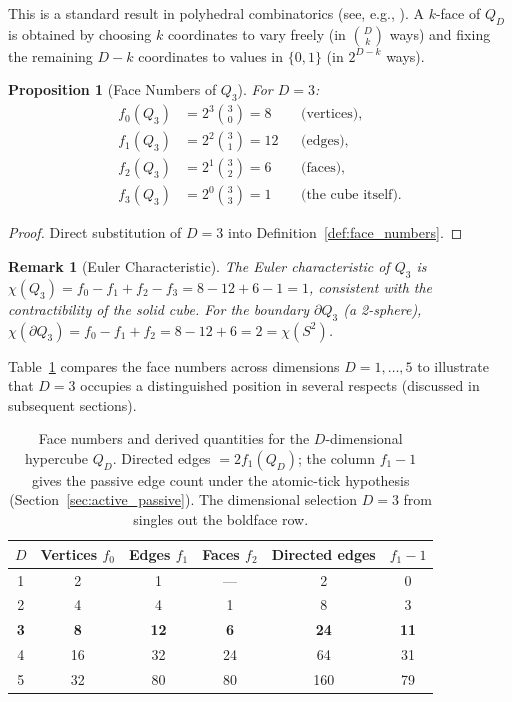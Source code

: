 \documentclass[11pt]{article}
\newtheorem{proposition}[theorem]{Proposition}
\newtheorem{remark}[theorem]{Remark}
\begin{document}
This is a standard result in polyhedral combinatorics (see, e.g., \cite{Ziegler1995}).
A $k$-face of $Q_D$ is obtained by choosing $k$ coordinates to vary freely (in $\binom{D}{k}$ ways) and fixing the remaining $D-k$ coordinates to values in $\{0,1\}$ (in $2^{D-k}$ ways).

\begin{proposition}[Face Numbers of $Q_3$]\label{prop:face_numbers}
For $D = 3$:
\begin{align}
f_0(Q_3) &= 2^3 \binom{3}{0} = 8 &&\text{(vertices)}, \label{eq:vertices} \\
f_1(Q_3) &= 2^2 \binom{3}{1} = 12 &&\text{(edges)}, \label{eq:edges} \\
f_2(Q_3) &= 2^1 \binom{3}{2} = 6 &&\text{(faces)}, \label{eq:faces} \\
f_3(Q_3) &= 2^0 \binom{3}{3} = 1 &&\text{(the cube itself)}. \label{eq:cube}
\end{align}
\end{proposition}

\begin{proof}
Direct substitution of $D = 3$ into Definition~\ref{def:face_numbers}.
\end{proof}

\begin{remark}[Euler Characteristic]
The Euler characteristic of $Q_3$ is $\chi(Q_3) = f_0 - f_1 + f_2 - f_3 = 8 - 12 + 6 - 1 = 1$, consistent with the contractibility of the solid cube.
For the \emph{boundary} $\partial Q_3$ (a 2-sphere), $\chi(\partial Q_3) = f_0 - f_1 + f_2 = 8 - 12 + 6 = 2 = \chi(S^2)$.
\end{remark}

Table~\ref{tab:face_numbers} compares the face numbers across dimensions $D = 1, \ldots, 5$ to illustrate that $D = 3$ occupies a distinguished position in several respects (discussed in subsequent sections).

\begin{table}[h]
\centering
\begin{tabular}{cccccc}
\toprule
$D$ & Vertices $f_0$ & Edges $f_1$ & Faces $f_2$ & Directed edges & $f_1 - 1$ \\
\midrule
1 & 2 & 1 & --- & 2 & 0 \\
2 & 4 & 4 & 1 & 8 & 3 \\
\textbf{3} & \textbf{8} & \textbf{12} & \textbf{6} & \textbf{24} & \textbf{11} \\
4 & 16 & 32 & 24 & 64 & 31 \\
5 & 32 & 80 & 80 & 160 & 79 \\
\bottomrule
\end{tabular}
\caption{Face numbers and derived quantities for the $D$-dimensional hypercube $Q_D$.
Directed edges $= 2f_1(Q_D)$; the column $f_1 - 1$ gives the passive edge count under the atomic-tick hypothesis (Section~\ref{sec:active_passive}).
The dimensional selection $D = 3$ from \cite{PardoGuerraThapa2026} singles out the boldface row.}
\label{tab:face_numbers}
\end{table}
\end{document}
